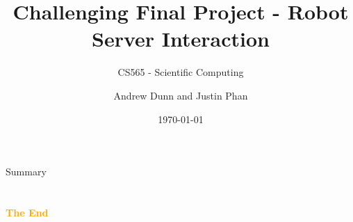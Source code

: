 \documentclass[aspectratio=43]{beamer}
\title{Challenging Final Project - Robot Server Interaction} %
\subtitle{CS565 - Scientific Computing}
\author[A. Dunn \& J. Phan]{Andrew Dunn and Justin Phan}
\institute[CSCWU]{
    Department of Computer Science%
    \\%
    Central Washington University%
} %
\date{\today}
\begin{document}
    
    \frame{\titlepage}
    
    \begin{frame}{Summary}
        \tableofcontents
    \end{frame}
    
     
    
     
    
    
    
     
    
    
    
    
    

    \section{}
    \begin{frame}{}
        \centering
            \Huge\bfseries
        \textcolor{orange}{The End}
    \end{frame}
\end{document}
